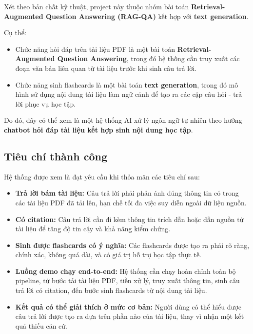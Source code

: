 \documentclass[12pt]{ai_conquer2026}
\begin{document}
Xét theo bản chất kỹ thuật, project này thuộc nhóm bài toán \textbf{Retrieval-Augmented Question Answering (RAG-QA)} kết hợp với \textbf{text generation}.

Cụ thể:

\begin{itemize}
    \item Chức năng hỏi đáp trên tài liệu PDF là một bài toán \textbf{Retrieval-Augmented Question Answering}, trong đó hệ thống cần truy xuất các đoạn văn bản liên quan từ tài liệu trước khi sinh câu trả lời.
    
    \item Chức năng sinh flashcards là một bài toán \textbf{text generation}, trong đó mô hình sử dụng nội dung tài liệu làm ngữ cảnh để tạo ra các cặp câu hỏi - trả lời phục vụ học tập.
\end{itemize}

Do đó, đây có thể xem là một hệ thống AI xử lý ngôn ngữ tự nhiên theo hướng \textbf{chatbot hỏi đáp tài liệu kết hợp sinh nội dung học tập}.

\subsection{Tiêu chí thành công}

Hệ thống được xem là đạt yêu cầu khi thỏa mãn các tiêu chí sau:

\begin{itemize}
    \item \textbf{Trả lời bám tài liệu:} Câu trả lời phải phản ánh đúng thông tin có trong các tài liệu PDF đã tải lên, hạn chế tối đa việc suy diễn ngoài dữ liệu nguồn.
    
    \item \textbf{Có citation:} Câu trả lời cần đi kèm thông tin trích dẫn hoặc dẫn nguồn từ tài liệu để tăng độ tin cậy và khả năng kiểm chứng.
    
    \item \textbf{Sinh được flashcards có ý nghĩa:} Các flashcards được tạo ra phải rõ ràng, chính xác, không quá dài, và có giá trị hỗ trợ học tập thực tế.
    
    \item \textbf{Luồng demo chạy end-to-end:} Hệ thống cần chạy hoàn chỉnh toàn bộ pipeline, từ bước tải tài liệu PDF, tiền xử lý, truy xuất thông tin, sinh câu trả lời có citation, đến bước sinh flashcards từ nội dung tài liệu.
    
    \item \textbf{Kết quả có thể giải thích ở mức cơ bản:} Người dùng có thể hiểu được câu trả lời được tạo ra dựa trên phần nào của tài liệu, thay vì nhận một kết quả thiếu căn cứ.
\end{itemize}
\end{document}
